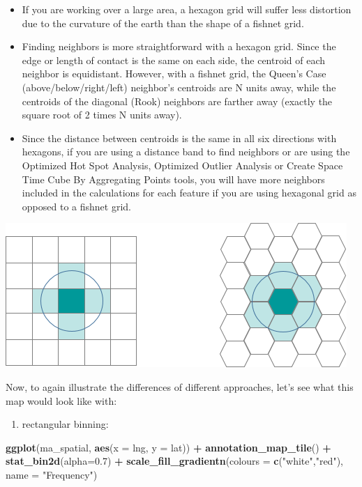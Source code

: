 \documentclass[]{book}
\newenvironment{Shaded}{\begin{snugshade}}{\end{snugshade}}
\newcommand{\DataTypeTok}[1]{\textcolor[rgb]{0.13,0.29,0.53}{#1}}
\newcommand{\FloatTok}[1]{\textcolor[rgb]{0.00,0.00,0.81}{#1}}
\newcommand{\KeywordTok}[1]{\textcolor[rgb]{0.13,0.29,0.53}{\textbf{#1}}}
\newcommand{\NormalTok}[1]{#1}
\newcommand{\OperatorTok}[1]{\textcolor[rgb]{0.81,0.36,0.00}{\textbf{#1}}}
\newcommand{\StringTok}[1]{\textcolor[rgb]{0.31,0.60,0.02}{#1}}
\providecommand{\tightlist}{%
  \setlength{\itemsep}{0pt}\setlength{\parskip}{0pt}}
\begin{document}
\begin{itemize}
\item
  If you are working over a large area, a hexagon grid will suffer less distortion due to the curvature of the earth than the shape of a fishnet grid.
\item
  Finding neighbors is more straightforward with a hexagon grid. Since the edge or length of contact is the same on each side, the centroid of each neighbor is equidistant. However, with a fishnet grid, the Queen's Case (above/below/right/left) neighbor's centroids are N units away, while the centroids of the diagonal (Rook) neighbors are farther away (exactly the square root of 2 times N units away).
\item
  Since the distance between centroids is the same in all six directions with hexagons, if you are using a distance band to find neighbors or are using the Optimized Hot Spot Analysis, Optimized Outlier Analysis or Create Space Time Cube By Aggregating Points tools, you will have more neighbors included in the calculations for each feature if you are using hexagonal grid as opposed to a fishnet grid.
\end{itemize}

\includegraphics{img/EE17F7E03F82-web.png}

Now, to again illustrate the differences of different approaches, let's see what this map would look like with:

\begin{enumerate}
\def\labelenumi{\alph{enumi})}
\tightlist
\item
  rectangular binning:
\end{enumerate}

\begin{Shaded}
\begin{Highlighting}[]
\KeywordTok{ggplot}\NormalTok{(ma_spatial, }\KeywordTok{aes}\NormalTok{(}\DataTypeTok{x =}\NormalTok{ lng, }\DataTypeTok{y =}\NormalTok{ lat)) }\OperatorTok{+}\StringTok{ }
\StringTok{  }\KeywordTok{annotation_map_tile}\NormalTok{() }\OperatorTok{+}\StringTok{ }
\StringTok{  }\KeywordTok{stat_bin2d}\NormalTok{(}\DataTypeTok{alpha=}\FloatTok{0.7}\NormalTok{) }\OperatorTok{+}\StringTok{ }
\StringTok{  }\KeywordTok{scale_fill_gradientn}\NormalTok{(}\DataTypeTok{colours =} \KeywordTok{c}\NormalTok{(}\StringTok{"white"}\NormalTok{,}\StringTok{"red"}\NormalTok{), }
                       \DataTypeTok{name =} \StringTok{"Frequency"}\NormalTok{) }
\end{Highlighting}
\end{Shaded}
\end{document}
